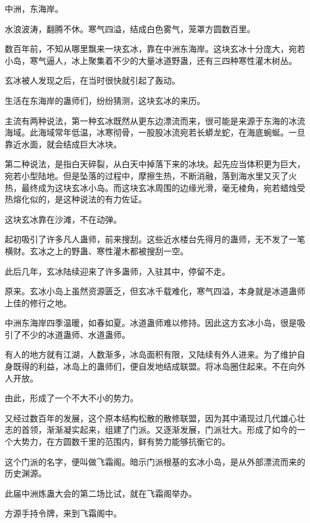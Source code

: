 
\begin{this_body}

中洲，东海岸。

水浪波涛，翻腾不休。寒气四溢，结成白色雾气，笼罩方圆数百里。

数百年前，不知从哪里飘来一块玄冰，靠在中洲东海岸。这块玄冰十分庞大，宛若小岛，寒气逼人，冰上聚集着不少的大量冰道野蛊，还有三四种寒性灌木树丛。

玄冰被人发现之后，在当时很快就引起了轰动。

生活在东海岸的蛊师们，纷纷猜测，这块玄冰的来历。

主流有两种说法，第一种玄冰既然从更东边漂流而来，很可能是来源于东海的冰流海域。此海域常年低温，冰寒彻骨，一股股冰流宛若长蟒龙蛇，在海底蜿蜒。一旦靠近水面，就会结成巨大冰块。

第二种说法，是指白天碎裂，从白天中掉落下来的冰块。起先应当体积更为巨大，宛若小型陆地。但是坠落的过程中，摩擦生热，不断消融，落到海水里又灭了火热，最终成为这块玄冰小岛。而这块玄冰周围的边缘光滑，毫无棱角，宛若蜡烛受热熔化似的，是这种说法的有力佐证。

这块玄冰靠在沙滩，不在动弹。

起初吸引了许多凡人蛊师，前来搜刮。这些近水楼台先得月的蛊师，无不发了一笔横财。玄冰之上的野蛊、寒性灌木都被搜刮一空。

此后几年，玄冰陆续迎来了许多蛊师，入驻其中，停留不走。

原来。玄冰小岛上虽然资源匮乏，但玄冰千载难化，寒气四溢，本身就是冰道蛊师上佳的修行之地。

中洲东海岸四季温暖，如春如夏。冰道蛊师难以修持。因此这方玄冰小岛，很是吸引了不少的冰道蛊师、水道蛊师。

有人的地方就有江湖，人数渐多，冰岛面积有限，又陆续有外人进来。为了维护自身既得的利益，冰岛上的蛊师们，便自发地结成联盟。将冰岛圈住起来。不在向外人开放。

由此，形成了一个不大不小的势力。

又经过数百年的发展，这个原本结构松散的散修联盟，因为其中涌现过几代雄心壮志的首领，渐渐凝实起来，组建了门派。又逐渐发展，门派壮大。形成了如今的一个大势力，在方圆数千里的范围内，鲜有势力能够抗衡它的。

这个门派的名字，便叫做飞霜阁。暗示门派根基的玄冰小岛，是从外部漂流而来的历史渊源。

此届中洲炼蛊大会的第二场比试，就在飞霜阁举办。

方源手持令牌，来到飞霜阁中。


\end{this_body}
